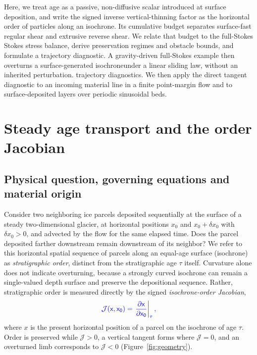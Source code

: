 \documentclass[review]{igs}
\providecommand{\DIFadd}[1]{{\protect\color{blue} \sf #1}} %
\providecommand{\DIFdel}[1]{{\protect\color{red} \scriptsize #1}} %
\providecommand{\DIFaddbegin}{} %
\providecommand{\DIFaddend}{} %
\providecommand{\DIFdelbegin}{} %
\providecommand{\DIFdelend}{} %
\newcommand{\DIFscaledelfig}{0.5}
\newlength{\DIFdelgraphicswidth} %
\newlength{\DIFdelgraphicsheight} %
\newcommand{\DIFaddincludegraphics}[2][]{{\color{blue}\fbox{\DIFOincludegraphics[#1]{#2}}}} %
\newcommand{\DIFdelincludegraphics}[2][]{%
\sbox{\DIFdelgraphicsbox}{\DIFOincludegraphics[#1]{#2}}%
\settoboxwidth{\DIFdelgraphicswidth}{\DIFdelgraphicsbox} %
\settoboxtotalheight{\DIFdelgraphicsheight}{\DIFdelgraphicsbox} %
\scalebox{\DIFscaledelfig}{%
\parbox[b]{\DIFdelgraphicswidth}{\usebox{\DIFdelgraphicsbox}\\[-\baselineskip] \rule{\DIFdelgraphicswidth}{0em}}\llap{\resizebox{\DIFdelgraphicswidth}{\DIFdelgraphicsheight}{%
\setlength{\unitlength}{\DIFdelgraphicswidth}%
\begin{picture}(1,1)%
\thicklines\linethickness{2pt} %
{\color[rgb]{1,0,0}\put(0,0){\framebox(1,1){}}}%
{\color[rgb]{1,0,0}\put(0,0){\line( 1,1){1}}}%
{\color[rgb]{1,0,0}\put(0,1){\line(1,-1){1}}}%
\end{picture}%
}\hspace*{3pt}}} %
} %
\DeclareRobustCommand{\DIFaddbegin}{\DIFOaddbegin \let\includegraphics\DIFaddincludegraphics} %
\DeclareRobustCommand{\DIFaddend}{\DIFOaddend \let\includegraphics\DIFOincludegraphics} %
\DeclareRobustCommand{\DIFdelbegin}{\DIFOdelbegin \let\includegraphics\DIFdelincludegraphics} %
\DeclareRobustCommand{\DIFdelend}{\DIFOaddend \let\includegraphics\DIFOincludegraphics} %
\begin{document}
Here, we treat age as a passive, non-diffusive scalar introduced at surface deposition, and write the signed inverse vertical-thinning factor as the horizontal order of particles along an isochrone. Its cumulative budget separates surface-fast regular shear and extrusive reverse shear. We relate that budget to the \DIFdelbegin \DIFdel{full-Stokes }\DIFdelend \DIFaddbegin \DIFadd{Stokes }\DIFaddend stress balance, derive preservation regimes and obstacle bounds, and formulate \DIFdelbegin \DIFdel{a trajectory diagnostic. A gravity-driven full-Stokes example then overturns a surface-generated isochroneunder a linear sliding law, without an inherited perturbation.
}\DIFdelend \DIFaddbegin \DIFadd{trajectory diagnostics. We then apply the direct tangent diagnostic to an incoming material line in a finite point-margin flow and to surface-deposited layers over periodic sinusoidal beds.
}\DIFaddend 

\section{Steady age transport and the order Jacobian}

\DIFdelbegin %
\DIFdelend \DIFaddbegin \subsection{Physical question, governing equations and material origin}
\DIFaddend 

\DIFaddbegin \DIFadd{Consider two neighboring ice parcels deposited sequentially at the surface of a steady two-dimensional glacier, at horizontal positions \(x_0\) and \(x_0+\delta x_0\) with \(\delta x_0>0\), and advected by the flow for the same elapsed time. Does the parcel deposited farther downstream remain downstream of its neighbor? We refer to this horizontal spatial sequence of parcels along an equal-age surface (isochrone) as \emph{stratigraphic order}, distinct from the stratigraphic age \(\tau\) itself. Curvature alone does not indicate overturning, because a strongly curved isochrone can remain a single-valued depth surface and preserve the depositional sequence. Rather, stratigraphic order is measured directly by the signed \emph{isochrone-order Jacobian},
}\begin{equation}
\DIFadd{\mathcal{J}(x,x_0)
=\left.\frac{\partial x}{\partial x_0}\right|_{\tau},
\label{eq:Jdefinition}
}\end{equation}
\DIFadd{where \(x\) is the present horizontal position of a parcel on the isochrone of age \(\tau\). Order is preserved while \(\mathcal{J}>0\), a vertical tangent forms where \(\mathcal{J}=0\), and an overturned limb corresponds to \(\mathcal{J}<0\) (Figure~\ref{fig:geometry}).
}
\end{document}
